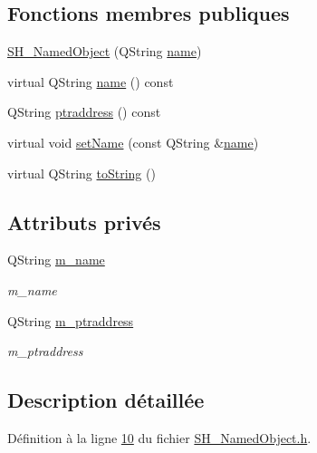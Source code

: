 \subsection*{Fonctions membres publiques}
\begin{DoxyCompactItemize}
\item 
\hyperlink{classSH__NamedObject_a6ceff219e80ad3f5c36db5f4258e74fd}{S\-H\-\_\-\-Named\-Object} (Q\-String \hyperlink{classSH__NamedObject_a970f265df31b28b2179bbbceb6170ac2}{name})
\item 
virtual Q\-String \hyperlink{classSH__NamedObject_a970f265df31b28b2179bbbceb6170ac2}{name} () const 
\item 
Q\-String \hyperlink{classSH__NamedObject_a98806c492b55a54d01330bbecce5118b}{ptraddress} () const 
\item 
virtual void \hyperlink{classSH__NamedObject_a18e1860b747e029eefa140f8324bb503}{set\-Name} (const Q\-String \&\hyperlink{classSH__NamedObject_a970f265df31b28b2179bbbceb6170ac2}{name})
\item 
virtual Q\-String \hyperlink{classSH__NamedObject_af73e97f6476ca1ef3a22b159d179f5e7}{to\-String} ()
\end{DoxyCompactItemize}
\subsection*{Attributs privés}
\begin{DoxyCompactItemize}
\item 
Q\-String \hyperlink{classSH__NamedObject_a7f8e3346256986c337a792339ea5a015}{m\-\_\-name}
\begin{DoxyCompactList}\small\item\em m\-\_\-name \end{DoxyCompactList}\item 
Q\-String \hyperlink{classSH__NamedObject_acfc489299f90750082785bf9ac42f4ff}{m\-\_\-ptraddress}
\begin{DoxyCompactList}\small\item\em m\-\_\-ptraddress \end{DoxyCompactList}\end{DoxyCompactItemize}


\subsection{Description détaillée}


Définition à la ligne \hyperlink{SH__NamedObject_8h_source_l00010}{10} du fichier \hyperlink{SH__NamedObject_8h_source}{S\-H\-\_\-\-Named\-Object.\-h}.



